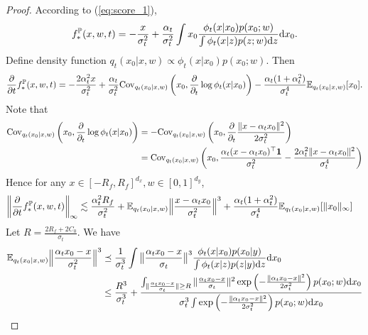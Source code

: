 \documentclass[11pt]{article}
\numberwithin{equation}{section}
\renewcommand{\P}{\mathbb{P}}
\renewcommand{\eqref}[1]{(\ref{#1})}
\begin{document}
\begin{proof}
    According to \eqref{eq:score_1},
    \begin{equation}
        f_*^\P(x,w,t)=-\frac{x}{\sigma_t^2}+\frac{\alpha_t}{\sigma_t^2}\int x_0\frac{\phi_t(x|x_0)p(x_0;w)}{\int \phi_t(x|z)p(z;w)\dif z}\dif x_0.
    \end{equation}
    Define density function $q_t(x_0|x,w)\propto \phi_t(x|x_0)p(x_0;w)$. Then
    \begin{equation}
        \frac{\partial}{\partial t}f_*^\P(x,w,t)
        = -\frac{2\alpha_t^2x}{\sigma_t^2}+\frac{\alpha_t}{\sigma_t^2}\Cov_{q_t(x_0|x,w)}\left(x_0,\frac{\partial}{\partial_t}\log\phi_t(x|x_0)\right) - \frac{\alpha_t(1+\alpha_t^2)}{\sigma_t^4}\E_{q_t(x_0|x,w)}[x_0].
    \end{equation}
    Note that 
    \begin{equation}
        \begin{aligned}
            \mathrm{Cov}_{q_t(x_0|x,w)}\left(x_0,\frac{\partial}{\partial_t}\log\phi_t(x|x_0)\right)
            &= -\mathrm{Cov}_{q_t(x_0|x,w)}\left(x_0,\frac{\partial}{\partial_t}\frac{\|x-\alpha_tx_0\|^2}{2\sigma_t^2}\right) \\
            &= \mathrm{Cov}_{q_t(x_0|x,w)}\left(x_0,\frac{\alpha_t(x-\alpha_tx_0)^\top\bm{1}}{\sigma_t^2}-\frac{2\alpha_t^2\|x-\alpha_tx_0\|^2}{\sigma_t^4}\right)
        \end{aligned}
    \end{equation}
    Hence for any $x\in[-R_f,R_f]^{d_x},w\in[0,1]^{d_y}$, 
    \begin{equation}
        \begin{aligned}
            \left\|\frac{\partial}{\partial t}f_*^\P(x,w,t)\right\|_\infty
            &\lesssim \frac{\alpha_t^2R_f}{\sigma_t^2}+\E_{q_t(x_0|x,w)}\Big\|\frac{x-\alpha_tx_0}{\sigma_t^2}\Big\|^3 + \frac{\alpha_t(1+\alpha_t^2)}{\sigma_t^4}\E_{q_t(x_0|x,w)}[\|x_0\|_\infty]
        \end{aligned}
    \end{equation}
    Let $R=\frac{2R_f+2C_0}{\sigma_t}$. We have
    \begin{equation}
        \begin{aligned}
            \E_{q_t(x_0|x,w)}\Big\|\frac{\alpha_tx_0-x}{\sigma_t^2}\Big\|^3
            &\preceq \frac{1}{\sigma_t^3}\int \big\|\frac{\alpha_tx_0-x}{\sigma_t}\big\|^3\frac{\phi_t(x|x_0)p(x_0|y)}{\int \phi_t(x|z)p(z|y)\dif z}\dif x_0 \\
            &\leq \frac{R^3}{\sigma_t^3} + \frac{\int_{\|\frac{\alpha_tx_0-x}{\sigma_t}\|\geq R} \|\frac{\alpha_tx_0-x}{\sigma_t}\|^2\exp\left(-\frac{\|\alpha_tx_0-x\|^2}{2\sigma_t^2}\right)p(x_0;w)\dif x_0}{\sigma_t^3\int \exp\left(-\frac{\|\alpha_tx_0-x\|^2}{2\sigma_t^2}\right)p(x_0;w)\dif x_0} \\

\end{aligned}
\end{equation}
\end{proof}
\end{document}
